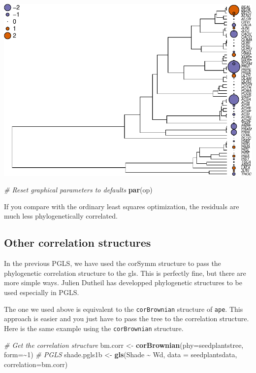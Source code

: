 \documentclass[
]{book}
\newenvironment{Shaded}{\begin{snugshade}}{\end{snugshade}}
\newcommand{\AttributeTok}[1]{\textcolor[rgb]{0.13,0.29,0.53}{#1}}
\newcommand{\CommentTok}[1]{\textcolor[rgb]{0.56,0.35,0.01}{\textit{#1}}}
\newcommand{\DecValTok}[1]{\textcolor[rgb]{0.00,0.00,0.81}{#1}}
\newcommand{\FunctionTok}[1]{\textcolor[rgb]{0.13,0.29,0.53}{\textbf{#1}}}
\newcommand{\NormalTok}[1]{#1}
\newcommand{\OtherTok}[1]{\textcolor[rgb]{0.56,0.35,0.01}{#1}}
\newcommand{\SpecialCharTok}[1]{\textcolor[rgb]{0.81,0.36,0.00}{\textbf{#1}}}
\begin{document}
\includegraphics{pcm-workshop_files/figure-latex/pgls residual fit-1.pdf}

\begin{Shaded}
\begin{Highlighting}[]
\CommentTok{\# Reset graphical parameters to defaults}
\FunctionTok{par}\NormalTok{(op) }
\end{Highlighting}
\end{Shaded}

If you compare with the ordinary least squares optimization, the residuals are much less phylogenetically correlated.

\subsection{Other correlation structures}\label{other-correlation-structures}

In the previous PGLS, we have used the corSymm structure to pass the phylogenetic correlation structure to the gls. This is perfectly fine, but there are more simple ways. Julien Dutheil has developped phylogenetic structures to be used especially in PGLS.

The one we used above is equivalent to the \texttt{corBrownian} structure of \texttt{ape}. This approach is easier and you just have to pass the tree to the correlation structure. Here is the same example using the \texttt{corBrownian} structure.

\begin{Shaded}
\begin{Highlighting}[]
\CommentTok{\# Get the correlation structure}
\NormalTok{bm.corr }\OtherTok{\textless{}{-}} \FunctionTok{corBrownian}\NormalTok{(}\AttributeTok{phy=}\NormalTok{seedplantstree, }\AttributeTok{form=}\SpecialCharTok{\textasciitilde{}}\DecValTok{1}\NormalTok{)}
\CommentTok{\# PGLS}
\NormalTok{shade.pgls1b }\OtherTok{\textless{}{-}} \FunctionTok{gls}\NormalTok{(Shade }\SpecialCharTok{\textasciitilde{}}\NormalTok{ Wd, }\AttributeTok{data =}\NormalTok{ seedplantsdata, }\AttributeTok{correlation=}\NormalTok{bm.corr)}
\end{Highlighting}
\end{Shaded}
\end{document}
